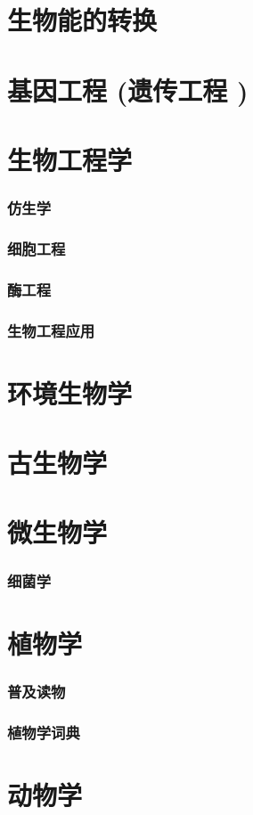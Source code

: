 \documentclass[UTF8]{../NatureUniverse}
\begin{document}
\section{生物能的转换}
\section{基因工程 (遗传工程 )}
\section{生物工程学}
    \subsubsection{仿生学}
    \subsubsection{细胞工程}
    \subsubsection{酶工程}
    \subsubsection{生物工程应用}
\section{环境生物学}
\section{古生物学}
\section{微生物学}
    \subsubsection{细菌学}
\section{植物学}
    \subsubsection{普及读物}
    \subsubsection{植物学词典}
\section{动物学}
\end{document}
